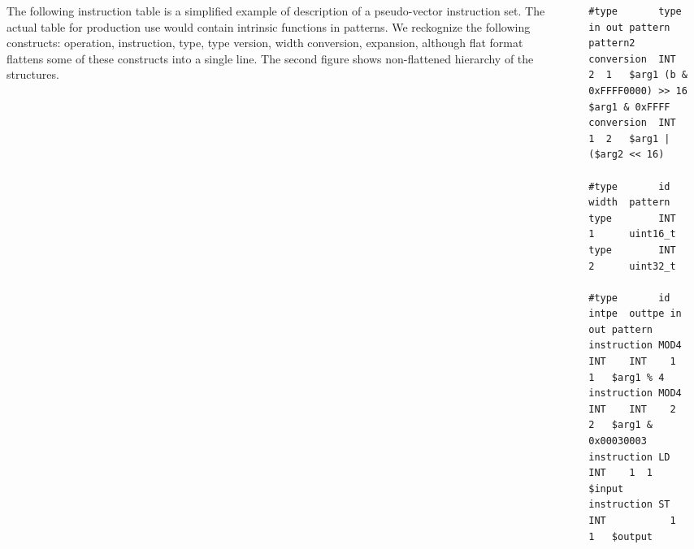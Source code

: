 \begin{columns}
\begin{column}{.25\textwidth}
\justify
The following instruction table is a simplified example of description of a pseudo-vector instruction set. The actual table for production use would contain intrinsic functions in patterns. We reckognize the following constructs: operation, instruction, type, type version, width conversion, expansion, although flat format flattens some of these constructs into a single line. The second figure shows non-flattened hierarchy of the structures.
\end{column}

\begin{column}{.02\textwidth}
\end{column}
\begin{column}{.38\textwidth}
\begin{verbatim}
#type       type in out pattern                       pattern2
conversion  INT  2  1   $arg1 (b & 0xFFFF0000) >> 16  $arg1 & 0xFFFF
conversion  INT  1  2   $arg1 | ($arg2 << 16)

#type       id   width  pattern
type        INT  1      uint16_t
type        INT  2      uint32_t

#type       id   intpe  outtpe in out pattern
instruction MOD4 INT    INT    1  1   $arg1 % 4
instruction MOD4 INT    INT    2  2   $arg1 & 0x00030003
instruction LD          INT    1  1   $input
instruction ST   INT           1  1   $output
\end{verbatim}
\end{column}

  \begin{column}{.3\textwidth}
  
\end{column}

\end{columns}

